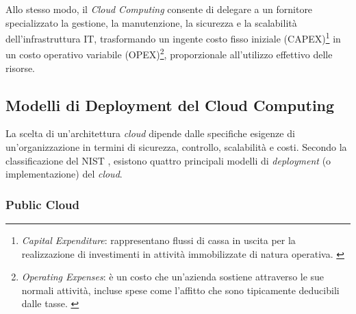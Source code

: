 
Allo stesso modo, il \textit{Cloud Computing} consente di delegare a un fornitore specializzato la gestione, la manutenzione, la sicurezza e la scalabilità dell'infrastruttura IT, trasformando un ingente costo fisso iniziale (CAPEX)\footnote{\textit{Capital Expenditure}: rappresentano flussi di cassa in uscita per la realizzazione di investimenti in attività immobilizzate di natura operativa. \cite{borsa-italiana-CAPEX}} in un costo operativo variabile (OPEX)\footnote{\textit{Operating Expenses}: è un costo che un'azienda sostiene attraverso le sue normali attività, incluse spese come l'affitto che sono tipicamente deducibili dalle tasse. \cite{opex}}, proporzionale all'utilizzo effettivo delle risorse.




\subsection{Modelli di Deployment del Cloud Computing}


La scelta di un'architettura \textit{cloud} dipende dalle specifiche esigenze di un'organizzazione in termini di sicurezza, controllo, scalabilità e costi. Secondo la classificazione del NIST \cite{NIST-cloud-computer}, esistono quattro principali modelli di \textit{deployment} (o implementazione) del \textit{cloud}.

\subsubsection{Public Cloud}



